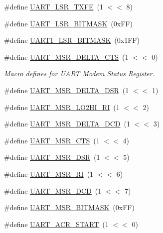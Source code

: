 \begin{DoxyCompactItemize}
\#define \hyperlink{group___u_a_r_t__18_x_x__43_x_x_ga1abf066d0f8b3400880a1909373cf699}{U\+A\+R\+T\+\_\+\+L\+S\+R\+\_\+\+T\+X\+FE}~(1 $<$$<$ 8)
\item 
\#define \hyperlink{group___u_a_r_t__18_x_x__43_x_x_ga3643d58e12f1d3bf342d140a5e3cb1ae}{U\+A\+R\+T\+\_\+\+L\+S\+R\+\_\+\+B\+I\+T\+M\+A\+SK}~(0x\+F\+F)
\item 
\#define \hyperlink{group___u_a_r_t__18_x_x__43_x_x_gad567d8ee9c41def9dea3d84c4633ac27}{U\+A\+R\+T1\+\_\+\+L\+S\+R\+\_\+\+B\+I\+T\+M\+A\+SK}~(0x1\+F\+F)
\item 
\#define \hyperlink{group___u_a_r_t__18_x_x__43_x_x_gad236b1cf377bf1b4600820b8a37c66ca}{U\+A\+R\+T\+\_\+\+M\+S\+R\+\_\+\+D\+E\+L\+T\+A\+\_\+\+C\+TS}~(1 $<$$<$ 0)
\begin{DoxyCompactList}\small\item\em Macro defines for U\+A\+RT Modem Status Register. \end{DoxyCompactList}\item 
\#define \hyperlink{group___u_a_r_t__18_x_x__43_x_x_ga2b5cee7872a43558a4c2631459198f9b}{U\+A\+R\+T\+\_\+\+M\+S\+R\+\_\+\+D\+E\+L\+T\+A\+\_\+\+D\+SR}~(1 $<$$<$ 1)
\item 
\#define \hyperlink{group___u_a_r_t__18_x_x__43_x_x_ga5b2defd6ffec805753fbf799838984ed}{U\+A\+R\+T\+\_\+\+M\+S\+R\+\_\+\+L\+O2\+H\+I\+\_\+\+RI}~(1 $<$$<$ 2)
\item 
\#define \hyperlink{group___u_a_r_t__18_x_x__43_x_x_ga0b880ad272a1356b38bb5ff30d972378}{U\+A\+R\+T\+\_\+\+M\+S\+R\+\_\+\+D\+E\+L\+T\+A\+\_\+\+D\+CD}~(1 $<$$<$ 3)
\item 
\#define \hyperlink{group___u_a_r_t__18_x_x__43_x_x_ga2cd867126cafb765b3d690e10f79b4c0}{U\+A\+R\+T\+\_\+\+M\+S\+R\+\_\+\+C\+TS}~(1 $<$$<$ 4)
\item 
\#define \hyperlink{group___u_a_r_t__18_x_x__43_x_x_gae4270c77bd681dee743930df8841765e}{U\+A\+R\+T\+\_\+\+M\+S\+R\+\_\+\+D\+SR}~(1 $<$$<$ 5)
\item 
\#define \hyperlink{group___u_a_r_t__18_x_x__43_x_x_ga1f4efd8727007b41de36b8b6ab9d4f6b}{U\+A\+R\+T\+\_\+\+M\+S\+R\+\_\+\+RI}~(1 $<$$<$ 6)
\item 
\#define \hyperlink{group___u_a_r_t__18_x_x__43_x_x_ga9a85f5379c5d15ebc486c4b174196afb}{U\+A\+R\+T\+\_\+\+M\+S\+R\+\_\+\+D\+CD}~(1 $<$$<$ 7)
\item 
\#define \hyperlink{group___u_a_r_t__18_x_x__43_x_x_ga79745d229ade663104e0a00c7597aa45}{U\+A\+R\+T\+\_\+\+M\+S\+R\+\_\+\+B\+I\+T\+M\+A\+SK}~(0x\+F\+F)
\item 
\#define \hyperlink{group___u_a_r_t__18_x_x__43_x_x_gaf6a6a4cb65edff2871ba48d3f2b445dc}{U\+A\+R\+T\+\_\+\+A\+C\+R\+\_\+\+S\+T\+A\+RT}~(1 $<$$<$ 0)

\end{DoxyCompactItemize}
